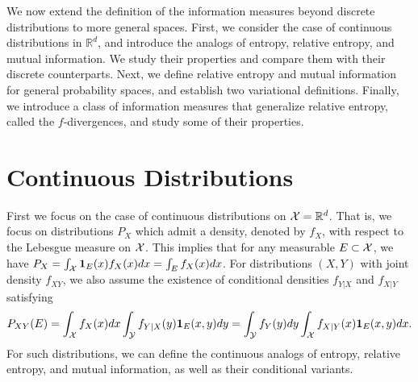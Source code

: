     We now extend the definition of the information measures beyond discrete distributions to more general spaces. First, we consider the case of continuous distributions in $\mathbb{R}^d$, and introduce the analogs of entropy, relative entropy, and mutual information. We study their properties and compare them with their discrete counterparts. Next, we define relative entropy and mutual information for general probability spaces, and establish two variational definitions. Finally, we introduce a class of information measures that generalize relative entropy, called the $f$-divergences, and study some of their properties. 

 
    \section{Continuous Distributions}
        First we focus on the case of continuous distributions on $\mathcal{X} =\mathbb{R}^d$. That is, we focus on distributions $P_X$ which admit a density, denoted by $f_X$, with respect to the Lebesgue measure on $\mathcal{X}$. This implies that for any measurable $E \subset \mathcal{X}$, we have $P_X = \int_{\mathcal{X}} \boldsymbol{1}_E(x) f_X(x) dx  = \int_{E} f_X(x) dx$. For distributions $(X, Y)$ with joint density $f_{XY}$, we also assume the existence of conditional densities $f_{Y|X}$ and $f_{X|Y}$ satisfying 
        \begin{align}
            P_{XY}(E) = \int_{\mathcal{X}}f_X(x)dx \int_{\mathcal{Y}} f_{Y|X}(y) \boldsymbol{1}_E(x,y)dy = \int_{\mathcal{Y}}f_Y(y)dy \int_{\mathcal{X}} f_{X|Y}(x) \boldsymbol{1}_E(x,y)dx.  
        \end{align}
        For such distributions, we can define the continuous analogs of entropy, relative entropy, and mutual information, as well as their conditional variants. 

